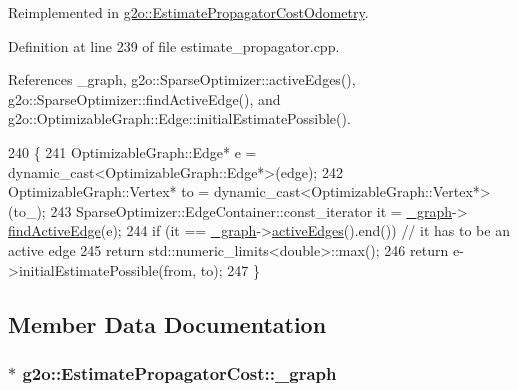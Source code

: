 Reimplemented in \hyperlink{classg2o_1_1EstimatePropagatorCostOdometry_a5f479f6d87636d71913c2a390047ea71}{g2o\+::\+Estimate\+Propagator\+Cost\+Odometry}.



Definition at line 239 of file estimate\+\_\+propagator.\+cpp.



References \+\_\+graph, g2o\+::\+Sparse\+Optimizer\+::active\+Edges(), g2o\+::\+Sparse\+Optimizer\+::find\+Active\+Edge(), and g2o\+::\+Optimizable\+Graph\+::\+Edge\+::initial\+Estimate\+Possible().


\begin{DoxyCode}
240   \{
241     OptimizableGraph::Edge* e = \textcolor{keyword}{dynamic\_cast<}OptimizableGraph::Edge*\textcolor{keyword}{>}(edge);
242     OptimizableGraph::Vertex* to = \textcolor{keyword}{dynamic\_cast<}OptimizableGraph::Vertex*\textcolor{keyword}{>}(to\_);
243     SparseOptimizer::EdgeContainer::const\_iterator it = \hyperlink{classg2o_1_1EstimatePropagatorCost_adf778ed8de5b54eb934e88107fe77980}{\_graph}->
      \hyperlink{classg2o_1_1SparseOptimizer_a68b59bf6d56a390717b82b3ae009ccf0}{findActiveEdge}(e);
244     \textcolor{keywordflow}{if} (it == \hyperlink{classg2o_1_1EstimatePropagatorCost_adf778ed8de5b54eb934e88107fe77980}{\_graph}->\hyperlink{classg2o_1_1SparseOptimizer_aef20b7dd401862d572a851349d1bc124}{activeEdges}().end()) \textcolor{comment}{// it has to be an active edge}
245       \textcolor{keywordflow}{return} std::numeric\_limits<double>::max();
246     \textcolor{keywordflow}{return} e->initialEstimatePossible(from, to);
247   \}
\end{DoxyCode}


\subsection{Member Data Documentation}
\subsubsection[{\texorpdfstring{\+\_\+graph}{_graph}}]{$\ast$ g2o\+::\+Estimate\+Propagator\+Cost\+::\+\_\+graph\hspace{0.3cm}{\ttfamily [protected]}}\hypertarget{classg2o_1_1EstimatePropagatorCost_adf778ed8de5b54eb934e88107fe77980}{}\label{classg2o_1_1EstimatePropagatorCost_adf778ed8de5b54eb934e88107fe77980}


